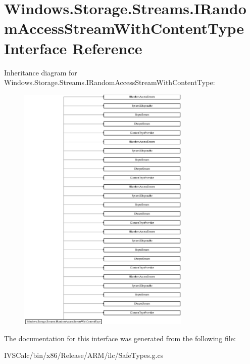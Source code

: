 \hypertarget{interface_windows_1_1_storage_1_1_streams_1_1_i_random_access_stream_with_content_type}{}\section{Windows.\+Storage.\+Streams.\+I\+Random\+Access\+Stream\+With\+Content\+Type Interface Reference}
\label{interface_windows_1_1_storage_1_1_streams_1_1_i_random_access_stream_with_content_type}
Inheritance diagram for Windows.\+Storage.\+Streams.\+I\+Random\+Access\+Stream\+With\+Content\+Type\+:\begin{figure}[H]
\begin{center}
\leavevmode
\includegraphics[height=12.000000cm]{interface_windows_1_1_storage_1_1_streams_1_1_i_random_access_stream_with_content_type}
\end{center}
\end{figure}


The documentation for this interface was generated from the following file\+:\begin{DoxyCompactItemize}
\item 
I\+V\+S\+Calc/bin/x86/\+Release/\+A\+R\+M/ilc/Safe\+Types.\+g.\+cs\end{DoxyCompactItemize}
